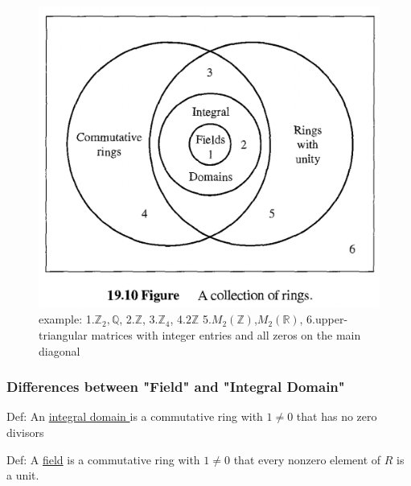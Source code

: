 \documentclass[11pt,a4paper]{article}
\begin{document}
\begin{center}\begin{figure}[htbp]
    \centering
    \includegraphics[scale=0.5]{collection of rings.png}
    \caption{example: 1.$\mathbb{Z}_2,\mathbb{Q}$, 2.$\mathbb{Z}$, 3.$\mathbb{Z}_4$, 4.$2\mathbb{Z}$ 5.$M_2(\mathbb{Z})$,$M_2(\mathbb{R})$, 6.upper-triangular matrices with integer entries and all zeros on the main diagonal}
    \label{}
\end{figure}\end{center}

\subsubsection{Differences between "Field" and "Integral Domain"}
Def: An \underline{integral domain
} is a commutative ring with $1\neq 0$ that has no zero divisors

Def: A \underline{field} is a commutative ring with $1\neq 0$ that every nonzero element of $R$ is a unit.
\end{document}
